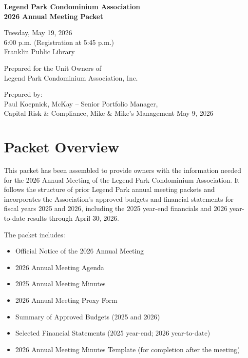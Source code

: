\documentclass[11pt]{article}
\begin{document}
\thispagestyle{plain}


\begin{titlepage}
    \centering
    \vspace*{2cm}
    {\Huge\bfseries Legend Park Condominium Association\\[0.5em]
    2026 Annual Meeting Packet\par}
    \vspace{2cm}
    {\Large Tuesday, May 19, 2026\\[0.25em]
    6{:}00 p.m. (Registration at 5{:}45 p.m.)\\[0.5em]
    Franklin Public Library\par}
    \vfill
    {\large Prepared for the Unit Owners of\\[0.25em]
    Legend Park Condominium Association, Inc.}
    \vspace{1cm}

    {\large Prepared by:\\[0.25em]
    Paul Koepnick, McKay -- Senior Portfolio Manager,\\
    Capital Risk \& Compliance, Mike \& Mike's Management}
    \vfill
    {\large May 9, 2026}
\end{titlepage}

\tableofcontents
\newpage

\section*{Packet Overview}

This packet has been assembled to provide owners with the information needed for the 2026
Annual Meeting of the Legend Park Condominium Association. It follows the structure of prior
Legend Park annual meeting packets and incorporates the Association's approved budgets and
financial statements for fiscal years 2025 and 2026, including the 2025 year-end financials
and 2026 year-to-date results through April 30, 2026.

The packet includes:
\begin{itemize}[leftmargin=1.1em]
    \item Official Notice of the 2026 Annual Meeting
    \item 2026 Annual Meeting Agenda
    \item 2025 Annual Meeting Minutes
    \item 2026 Annual Meeting Proxy Form
    \item Summary of Approved Budgets (2025 and 2026)
    \item Selected Financial Statements (2025 year-end; 2026 year-to-date)
    \item 2026 Annual Meeting Minutes Template (for completion after the meeting)
\end{itemize}
\end{document}
